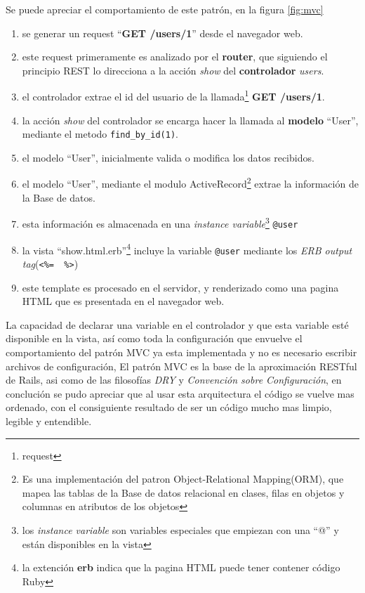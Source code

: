       Se puede apreciar el comportamiento de este patrón, en la figura \ref{fig:mvc}

      \begin{enumerate}
        \item se  generar un request ``\textbf{GET /users/1}'' desde el navegador web.
        \item este request primeramente es analizado por el \textbf{router}, que siguiendo el principio
        REST  lo direcciona a la acción \emph{show} del \textbf{controlador} \emph{users}.
        \item el controlador extrae el id del usuario de la llamada\footnote{ request} \textbf{GET /users/1}.
        \item la acción \emph{show} del controlador se encarga hacer la llamada al \textbf{modelo} ``User'',
        mediante el metodo \verb|find_by_id(1)|.
        \item el modelo ``User'', inicialmente valida o modifica los datos recibidos.
        \item el modelo ``User'', mediante el modulo ActiveRecord\footnote{ Es una implementaci\'on del patron
        Object-Relational Mapping(ORM), que mapea las tablas de la Base de datos relacional en clases, filas en objetos y 
        columnas en atributos de los objetos  } 
        extrae  la informaci\'on de la Base de datos.
        \item esta informaci\'on es almacenada en una
         \emph{instance variable}\footnote{los \emph{instance variable} son 
         variables especiales que empiezan con una ``@'' y están disponibles en la vista } \verb|@user|
        \item la vista ``show.html.erb''\footnote{ la extenci\'on \textbf{erb} 
        indica que la pagina HTML puede  tener contener código Ruby} incluye la variable \verb|@user| mediante los
        \emph{ERB output tag}(\verb|<%=  %>|)
        \item este template es procesado en el servidor, y renderizado como una 
        pagina HTML que es presentada en el navegador web.%
      \end{enumerate}



      La capacidad de declarar una variable en el controlador y 
      que esta variable esté disponible en la vista, así como toda 
      la configuración que envuelve el comportamiento del patrón MVC 
      ya esta implementada y no es necesario escribir archivos de configuración, 
      El patr\'on MVC es la base de la aproximaci\'on RESTful de Rails, asi como  de las filosofías 
      \emph{DRY} y \emph{Convenci\'on sobre Configuraci\'on}, 
           en concluci\'on se pudo apreciar que       al usar esta arquitectura el código 
      se vuelve mas  ordenado, con el consiguiente resultado de ser un código 
      mucho mas limpio, legible y entendible. \\ %


